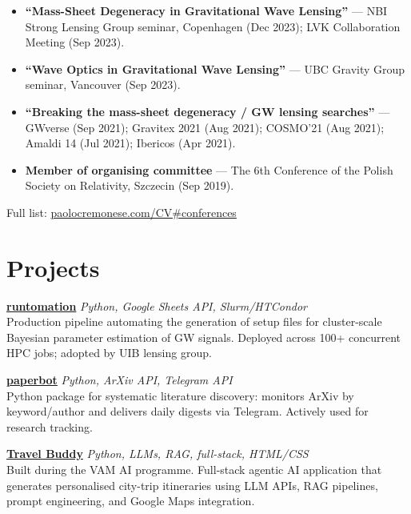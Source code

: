 \documentclass[10pt,a4paper]{article}
\begin{document}
\begin{itemize}[noitemsep, topsep=3pt, leftmargin=1.2em]
  \item \textbf{``Mass-Sheet Degeneracy in Gravitational Wave Lensing''} ---
        NBI Strong Lensing Group seminar, Copenhagen (Dec 2023);
        LVK Collaboration Meeting (Sep 2023).
  \item \textbf{``Wave Optics in Gravitational Wave Lensing''} ---
        UBC Gravity Group seminar, Vancouver (Sep 2023).
  \item \textbf{``Breaking the mass-sheet degeneracy / GW lensing searches''} ---
        GWverse (Sep 2021); Gravitex 2021 (Aug 2021); COSMO'21 (Aug 2021);
        Amaldi 14 (Jul 2021); Ibericos (Apr 2021).
  \item \textbf{Member of organising committee} ---
        The 6th Conference of the Polish Society on Relativity, Szczecin (Sep 2019).
\end{itemize}

{\small Full list: \href{https://www.paolocremonese.com/CV.html\#conferences}{paolocremonese.com/CV\#conferences}}

\section{Projects}

\textbf{\href{https://github.com/PaoloCremo/runtomation}{runtomation}} \hfill \textit{Python, Google Sheets API, Slurm/HTCondor}\\
{\small Production pipeline automating the generation of setup files for cluster-scale Bayesian
parameter estimation of GW signals. Deployed across 100+ concurrent HPC jobs; adopted by UIB
lensing group.}

\vspace{4pt}
\textbf{\href{https://github.com/PaoloCremo/paperbot}{paperbot}} \hfill \textit{Python, ArXiv API, Telegram API}\\
{\small Python package for systematic literature discovery: monitors ArXiv by keyword/author and
delivers daily digests via Telegram. Actively used for research tracking.}

\vspace{4pt}
\textbf{\href{https://paolocremonese.com/tb}{Travel Buddy}} \hfill \textit{Python, LLMs, RAG, full-stack, HTML/CSS}\\
{\small Built during the VAM AI programme. Full-stack agentic AI application that generates
personalised city-trip itineraries using LLM APIs, RAG pipelines, prompt engineering, and
Google Maps integration.}
\end{document}

